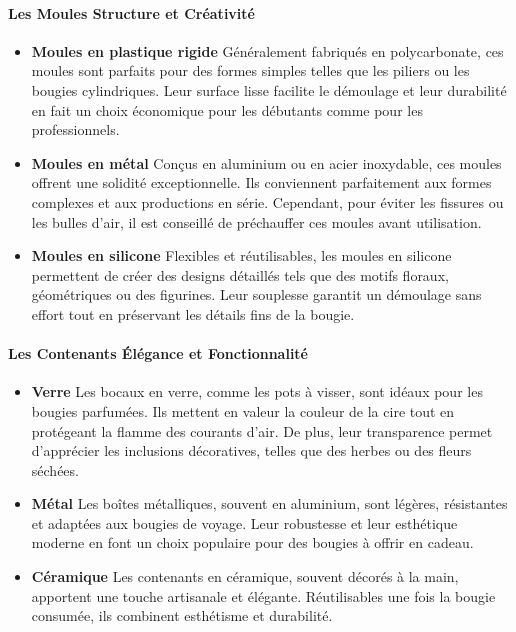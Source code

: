 \documentclass[11pt,fleqn,onecolumn,oneside]{book}
\begin{document}
\paragraph{Les Moules Structure et Créativité}
\begin{itemize}
    \item \textbf{Moules en plastique rigide} Généralement fabriqués en polycarbonate, ces moules sont parfaits pour des formes simples telles que les piliers ou les bougies cylindriques. Leur surface lisse facilite le démoulage et leur durabilité en fait un choix économique pour les débutants comme pour les professionnels.
    \item \textbf{Moules en métal} Conçus en aluminium ou en acier inoxydable, ces moules offrent une solidité exceptionnelle. Ils conviennent parfaitement aux formes complexes et aux productions en série. Cependant, pour éviter les fissures ou les bulles d’air, il est conseillé de préchauffer ces moules avant utilisation.
    \item \textbf{Moules en silicone} Flexibles et réutilisables, les moules en silicone permettent de créer des designs détaillés tels que des motifs floraux, géométriques ou des figurines. Leur souplesse garantit un démoulage sans effort tout en préservant les détails fins de la bougie.
\end{itemize}

\paragraph{Les Contenants Élégance et Fonctionnalité}
\begin{itemize}
    \item \textbf{Verre} Les bocaux en verre, comme les pots à visser, sont idéaux pour les bougies parfumées. Ils mettent en valeur la couleur de la cire tout en protégeant la flamme des courants d’air. De plus, leur transparence permet d’apprécier les inclusions décoratives, telles que des herbes ou des fleurs séchées.
    \item \textbf{Métal} Les boîtes métalliques, souvent en aluminium, sont légères, résistantes et adaptées aux bougies de voyage. Leur robustesse et leur esthétique moderne en font un choix populaire pour des bougies à offrir en cadeau.
    \item \textbf{Céramique} Les contenants en céramique, souvent décorés à la main, apportent une touche artisanale et élégante. Réutilisables une fois la bougie consumée, ils combinent esthétisme et durabilité.
\end{itemize}
\end{document}
